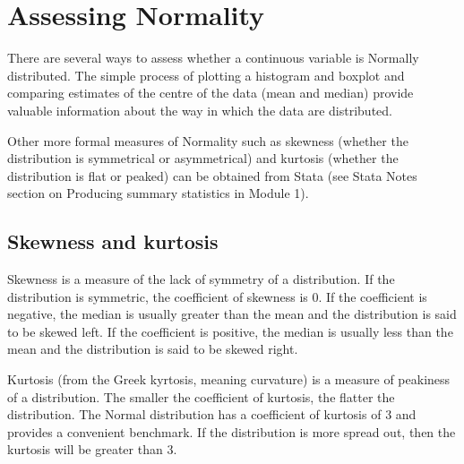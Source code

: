 \documentclass[
]{memoir}
\begin{document}
\hypertarget{assessing-normality}{%
\section{Assessing Normality}\label{assessing-normality}}

There are several ways to assess whether a continuous variable is Normally distributed. The simple process of plotting a histogram and boxplot and comparing estimates of the centre of the data (mean and median) provide valuable information about the way in which the data are distributed.

Other more formal measures of Normality such as skewness (whether the distribution is symmetrical or asymmetrical) and kurtosis (whether the distribution is flat or peaked) can be obtained from Stata (see Stata Notes section on Producing summary statistics in Module 1).

\hypertarget{skewness-and-kurtosis}{%
\subsection{Skewness and kurtosis}\label{skewness-and-kurtosis}}

Skewness is a measure of the lack of symmetry of a distribution. If the distribution is symmetric, the coefficient of skewness is 0. If the coefficient is negative, the median is usually greater than the mean and the distribution is said to be skewed left. If the coefficient is positive, the median is usually less than the mean and the distribution is said to be skewed right.

Kurtosis (from the Greek kyrtosis, meaning curvature) is a measure of peakiness of a distribution. The smaller the coefficient of kurtosis, the flatter the distribution. The Normal distribution has a coefficient of kurtosis of 3 and provides a convenient benchmark. If the distribution is more spread out, then the kurtosis will be greater than 3.

 
  \providecommand{\huxb}[2]{\arrayrulecolor[RGB]{#1}\global\arrayrulewidth=#2pt}
  \providecommand{\huxvb}[2]{\color[RGB]{#1}\vrule width #2pt}
  \providecommand{\huxtpad}[1]{\rule{0pt}{#1}}
  \providecommand{\huxbpad}[1]{\rule[-#1]{0pt}{#1}}
\end{document}
